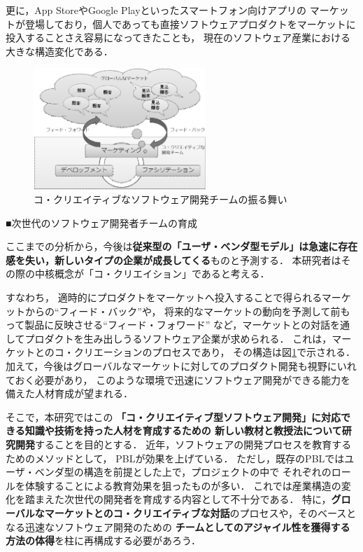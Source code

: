 \documentclass[11pt,a4paper,twoside]{jarticle}
\newcommand{\研究種別}{C}	%
\newcommand{\研究課題名}{コ・クリエイティブなソフトウェア開発者を育成するPBL型教育}
\newcommand{\研究機関名}{産業技術大学院大学}
\newcommand{\研究代表者氏名}{中鉢　欣秀}
\newcommand{\研究代表者氏名ふりがな}{ちゅうばち　よしひで}
\newcommand{\本応募effort}{\KLEffort{18}}	%
\newcommand{\研究期間の最終元号年度}{27}	%
\begin{document}
{    更に，App StoreやGoogle Playといったスマートフォン向けアプリの
    マーケットが登場しており，個人であっても直接ソフトウェアプロダクトをマーケットに投入することさえ容易になってきたことも，
    現在のソフトウェア産業における大きな構造変化である．
    
         \begin{figure}
			\vspace{-2cm}
         	\begin{center}
		         \includegraphics[width=6.5cm]{figs/CcSD.eps}
		         \caption{コ・クリエイティブなソフトウェア開発チームの振る舞い}
		         \label{fig:CcSD}
	         \end{center}
         \end{figure}
    
	\begin{flushleft}
		■次世代のソフトウェア開発者チームの育成
	\end{flushleft}

    ここまでの分析から，今後は{\bf 従来型の「ユーザ・ベンダ型モデル」は急速に存在感を失い，新しいタイプの企業が成長してくる}ものと予測する．
    本研究者はその際の中核概念が「コ・クリエイション」であると考える．
    
    すなわち，
    適時的にプロダクトをマーケットへ投入することで得られるマーケットからの``フィード・バック''や，
    将来的なマーケットの動向を予測して前もって製品に反映させる``フィード・フォワード''
    など，マーケットとの対話を通してプロダクトを生み出しうるソフトウェア企業が求められる．
    これは，マーケットとのコ・クリエーションのプロセスであり，
    その構造は図\ref{fig:CcSD}で示される．
    加えて，今後はグローバルなマーケットに対してのプロダクト開発も視野にいれておく必要があり，
    このような環境で迅速にソフトウェア開発ができる能力を備えた人材育成が望まれる．
    
    そこで，本研究ではこの
    {\bf 「コ・クリエイティブ型ソフトウェア開発」に対応できる知識や技術を持った人材を育成するための
    新しい教材と教授法について研究開発}することを目的とする．
    近年，ソフトウェアの開発プロセスを教育するためのメソッドとして，
    PBLが効果を上げている．
    ただし，既存のPBLではユーザ・ベンダ型の構造を前提とした上で，プロジェクトの中で
    それぞれのロールを体験することによる教育効果を狙ったものが多い．
    これでは産業構造の変化を踏まえた次世代の開発者を育成する内容として不十分である．
    特に，{\bf グローバルなマーケットとのコ・クリエイティブな対話}のプロセスや，そのベースとなる迅速なソフトウェア開発のための
    {\bf チームとしてのアジャイル性を獲得する方法の体得}を柱に再構成する必要があろう．
    
}
\end{document}
